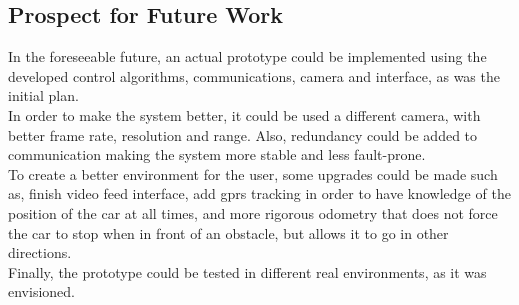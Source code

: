 \subsection{Prospect for Future Work}
In the foreseeable future, an actual prototype could be implemented using the developed control algorithms, communications, camera and interface, as was the initial plan.\\
In order to make the system better, it could be used a different camera, with better frame rate, resolution and range. Also, redundancy could be added to communication making the system more stable and less fault-prone. 
\\To create a better environment for the user, some upgrades could be made such as, finish video feed interface, add gprs tracking in order to have knowledge of the position of the car at all times, and more rigorous odometry that does not force the car to stop when in front of an obstacle, but allows it to go in other directions.\\
Finally, the prototype could be tested in different real environments, as it was envisioned.
